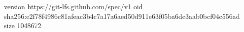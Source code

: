 version https://git-lfs.github.com/spec/v1
oid sha256:e2f78f4986c81afeac3b4c7a17a6aed50d911e63f05ba6dc3aab0bcf04c556ad
size 1048672

